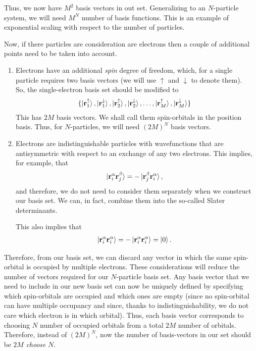 \documentclass[12pt,oneside]{book}
\begin{document}
Thus, we now have $M^2$ basis vectors in out set. Generalizing to an $N$-particle system, we will need $M^N$ number of basis functions. This is an example of exponential scaling with respect to the number of particles.

Now, if there particles are consideration are electrons then a couple of additional points need to be taken into account.
\begin{enumerate}
    \item Electrons have an additional \textit{spin} degree of freedom, which, for a single particle requires two basis vectors (we will use $\uparrow$ and $\downarrow$ to denote them). So, the single-electron basis set should be modified to 
    \begin{align*}
        \{\ket{\mathbf{r}_1^\uparrow}, \ket{\mathbf{r}_1^\downarrow}, \ket{\mathbf{r}_2^\uparrow}, \ket{\mathbf{r}_2^\downarrow},\hdots, \ket{\mathbf{r}_M^\uparrow}, \ket{\mathbf{r}_M^\downarrow}\}
    \end{align*}
    This has $2M$ basis vectors.  We shall call them spin-orbitals in the position basis. Thus, for $N$-particles, we will need $(2M)^N$ basis vectors.
    \item Electrons are indistinguishable particles with wavefunctions that are antisymmetric with respect to an exchange of any two electrons. This implies, for example, that
    \begin{align}
        \ket{\mathbf{r}_i^\alpha\mathbf{r}_j^\beta} = -\ket{\mathbf{r}_j^\beta\mathbf{r}_i^\alpha},
    \end{align}
    and therefore, we do not need to consider them separately when we construct our basis set. We can, in fact, combine them into the so-called Slater determinants.

    This also implies that
\begin{align}
\ket{\mathbf{r}_i^\alpha\mathbf{r}_i^\alpha}=-\ket{\mathbf{r}_i^\alpha\mathbf{r}_i^\alpha}=\ket{0}.
\end{align}

\end{enumerate}

Therefore, from our basis set, we can discard any vector in which the same spin-orbital is occupied by multiple electrons. These considerations will reduce the number of vectors required for our $N$-particle basis set. Any basis vector that we need to include in our new basis set can now be uniquely defined by specifying which spin-orbitals are occupied and which ones are empty (since no spin-orbital can have multiple occupancy and since, thanks to indistinguishability, we do not care which electron is in which orbital). Thus, each basis vector corresponds to choosing $N$ number of occupied orbitals from a total $2M$ number of orbitals. Therefore, instead of $(2M)^N$, now the number of basis-vectors in our set should be \textit{$2M$ choose $N$}. 
\end{document}
